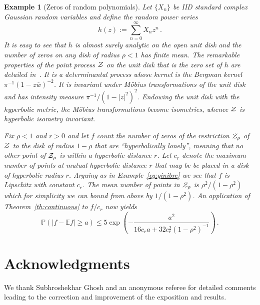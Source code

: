 \documentclass[10pt]{article}
\theoremstyle{plain}
\newtheorem{example}[thm]{Example}
\theoremstyle{remark}
\def\E{{\mathbb E}}
\def\P{{\mathbb P}}
\def\ZZ{{\cal Z}}
\begin{document}
\begin{example}[Zeros of random polynomials] \label{eg:zeros}
Let $\{ X_n \}$ be IID standard complex Gaussian random variables
and define the random power series
$$h(z) := \sum_{n=0}^\infty X_n z^n \, .$$
It is easy to see that $h$ is almost surely analytic on the
open unit disk and the number of zeros on any disk of radius
$\rho < 1$ has finite mean.  The remarkable properties of the point
process $\ZZ$ on the unit disk that is the zero set of $h$ are
detailed in~\cite{peres-virag}.  It is a determinantal process
whose kernel is the Bergman kernel $\pi^{-1} (1 - z \overline{w})^{-2}$.
It is invariant under M\"obius transformations of the unit disk
and has intensity measure $\pi^{-1} / (1 - |z|^2)^2$.  Endowing
the unit disk with the hyperbolic metric, the M\"obius transformations
become isometries, whence $\ZZ$ is hyperbolic isometry invariant.

Fix $\rho < 1$ and $r > 0$ and let $f$ count the number of
zeros of the restriction $\ZZ_\rho$ of $\ZZ$ to the disk
of radius $1-\rho$ that are ``hyperbolically lonely'',
meaning that no other point of $\ZZ_\rho$ is within a
hyperbolic distance $r$.  Let $c_r$ denote the maximum
number of points at mutual hyperbolic distance $r$ that
may be be placed in a disk of hyperbolic radius $r$.  Arguing
as in Example~\ref{eg:ginibre} we see that $f$ is Lipschitz
with constant $c_r$.  The mean number of points in $\ZZ_\rho$
is $\rho^2 / (1 - \rho^2)$ which for simplicity we can bound
from above by $1/(1-\rho^2)$.  An application of
Theorem~\ref{th:continuous} to $f / c_r$ now yields
$$\P (|f - \E f| \geq a) \leq 5 \exp \left (
   - \frac{a^2}{16 c_r a + 32 c_r^2 (1 - \rho^2)^{-1} } \right ) \, .$$
\end{example}

\section*{Acknowledgments}

We thank Subhroshekhar Ghosh and an anonymous referee for
detailed comments leading to the correction and improvement of
the exposition and results.




\end{document}

